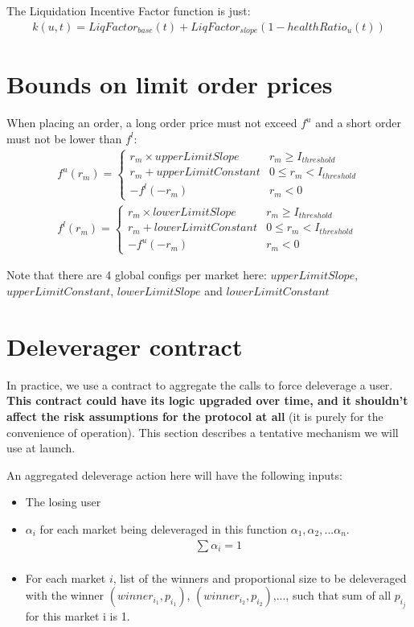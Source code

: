 \documentclass{article}%
\begin{document}
\begin{appendices}
The Liquidation Incentive Factor function is just:
\begin{align*}
    k(u, t) = LiqFactor_{base}(t) + LiqFactor_{slope}(1-healthRatio_u(t))
\end{align*}

\section{Bounds on limit order prices}
When placing an order, a long order price must not exceed $f^u$ and a short order must not be lower than $f^l$:
\begin{align*}
    f^u(r_m) =
    \begin{cases}
      r_m\times upperLimitSlope & r_m \geq I_{threshold} \\
      r_m + upperLimitConstant & 0 \leq r_m < I_{threshold} \\
      -f^l(-r_m) & r_m < 0
    \end{cases}\\
    f^l(r_m) =
    \begin{cases}
      r_m\times lowerLimitSlope & r_m \geq I_{threshold} \\
      r_m + lowerLimitConstant & 0 \leq r_m < I_{threshold} \\
      -f^u(-r_m) & r_m < 0
    \end{cases}
\end{align*}

Note that there are 4 global configs per market here: $upperLimitSlope$, $upperLimitConstant$, $lowerLimitSlope$ and $lowerLimitConstant$

\section{Deleverager contract}
In practice, we use a contract to aggregate the calls to force deleverage a user. \textbf{This contract could have its logic upgraded over time, and it shouldn't affect the risk assumptions for the protocol at all} (it is purely for the convenience of operation). This section describes a tentative mechanism we will use at launch.

An aggregated deleverage action here will have the following inputs:
\begin{itemize}
    \item The losing user
    \item $\alpha_i$ for each market being deleveraged in this function $\alpha_1, \alpha_2,... \alpha_n$.
    \begin{align*}
        \sum \alpha_i = 1\\
    \end{align*}
    \item For each market $i$, list of the winners and proportional size to be deleveraged with the winner $(winner_{i_1}, p_{i_1})$, $(winner_{i_2}, p_{i_2})$,..., such that sum of all $p_{i_j}$ for this market i is 1.
\end{itemize}


\end{appendices}
\end{document}
